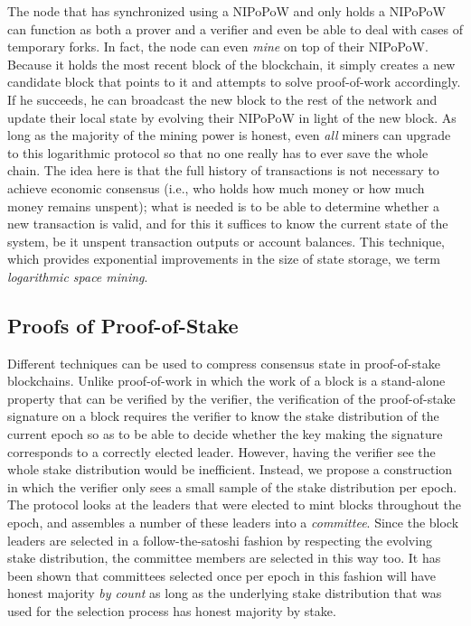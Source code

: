 The node that has synchronized using a NIPoPoW and only holds a NIPoPoW can
function as both a prover and a verifier and even be able to deal with cases
of temporary forks. In fact, the node can even \emph{mine} on top of their
NIPoPoW. Because it holds the most recent block of the blockchain, it simply
creates a new candidate block that points to it and attempts to solve
proof-of-work accordingly. If he succeeds, he can broadcast the new block to the
rest of the network and update their local state by evolving their NIPoPoW in
light of the new block. As long as the majority of the mining power is honest,
even \emph{all} miners can upgrade to this logarithmic protocol so that no one
really has to ever save the whole chain. The idea here is that the full history
of transactions is not necessary to achieve economic consensus (i.e., who holds
how much money or how much money remains unspent); what is needed
is to be able to determine whether a new transaction is valid, and for this it
suffices to know the current state of the system, be it unspent transaction
outputs or account balances. This technique, which provides exponential
improvements in the size of state storage, we term
\emph{logarithmic space mining}.

\subsection{Proofs of Proof-of-Stake}
Different techniques can be used to compress consensus state in proof-of-stake
blockchains. Unlike proof-of-work in which the work of a block is a stand-alone
property that can be verified by the verifier, the verification of the
proof-of-stake signature on a block requires the verifier to know the stake
distribution of the current epoch so as to be able to decide whether the key
making the signature corresponds to a correctly elected leader. However, having
the verifier see the whole stake distribution would be inefficient. Instead, we
propose a construction in which the verifier only sees a small sample of the
stake distribution per epoch. The protocol looks at the leaders that were
elected to mint blocks throughout the epoch, and assembles a number of these
leaders into a \emph{committee}. Since the block leaders are selected in a
follow-the-satoshi fashion by respecting the evolving stake distribution, the
committee members are selected in this way too. It has been shown that
committees selected once per epoch in this fashion will have honest majority
\emph{by count} as long as the underlying stake distribution that was used for
the selection process has honest majority by stake.

